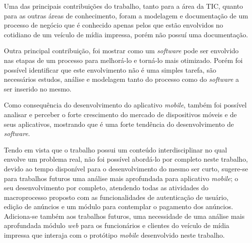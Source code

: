 \documentclass[
	12pt,				%
	openright,			%
	oneside,			%
	a4paper,			%
	chapter=TITLE,		%
	section=TITLE,		%
	english,			%
	french,				%
	spanish,			%
	brazil				%
	]{abntex2}
\begin{document}
Uma das principais contribuições do trabalho, tanto para a área da TIC, quanto para as outras áreas de conhecimento, foram a modelagem e documentação de um processo de negócio que é conhecido apenas pelos que estão envolvidos no cotidiano de um veículo de mídia impressa, porém não possuí uma documentação.

Outra principal contribuição, foi mostrar como um \textit{software} pode ser envolvido nas etapas de um processo para melhorá-lo e torná-lo mais otimizado. Porém foi possível identificar que este envolvimento não é uma simples tarefa, são necessários estudos, análise e modelagem tanto do processo como do \textit{software} a ser inserido no mesmo.

Como consequência do desenvolvimento do aplicativo \textit{mobile}, também foi possível analisar e perceber o forte crescimento do mercado de dispositivos móveis e de seus aplicativos, mostrando que é uma forte tendência do desenvolvimento de \textit{software}.

Tendo em vista que o trabalho possui um conteúdo interdisciplinar no qual envolve um problema real, não foi possível abordá-lo por completo neste trabalho, devido ao tempo disponível para o desenvolvimento do mesmo ser curto, sugere-se para trabalhos futuros uma análise mais aprofundada para aplicativo \textit{mobile}; o seu desenvolvimento por completo, atendendo todas as atividades do macroprocesso proposto com as funcionalidades de autenticação de usuário, edição de anúncios e um módulo para contemplar o pagamento dos anúncios. Adiciona-se também aos trabalhos futuros, uma necessidade de uma análise mais aprofundada módulo \textit{web} para os funcionários e clientes do veículo de mídia impressa que interaja com o protótipo \textit{mobile} desenvolvido neste trabalho.






%
%




\label{nropaginas}


\printindex
\end{document}

